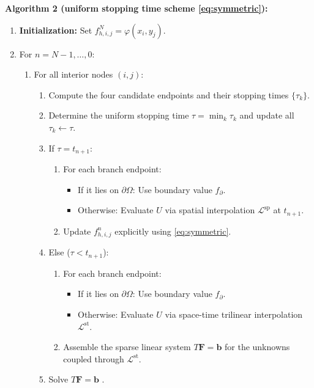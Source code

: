\documentclass[11pt]{article}
\theoremstyle{mythm}
\theoremstyle{definition}
\begin{document}
	\medskip
	\noindent
	\textbf{Algorithm 2 (uniform stopping time scheme \eqref{eq:symmetric}):}
	\begin{enumerate}
		\item \textbf{Initialization:} Set $f_{h,i,j}^N = \varphi(x_i, y_j)$.
		\item For $n = N-1, \dots, 0$:
		\begin{enumerate}
			\item For all interior nodes $(i,j)$:
			\begin{enumerate}
				\item Compute the four candidate endpoints and their stopping times $\{\tau_k\}$.
				\item Determine the uniform stopping time $\tau = \min_k \tau_k$ and update all $\tau_k \leftarrow \tau$.
				\item If $\tau = t_{n+1}$:
				\begin{enumerate}
					\item For each branch endpoint:
					\begin{itemize}
						\item If it lies on $\partial\Omega$: Use boundary value $f_{\partial}$.
						\item Otherwise: Evaluate $U$ via spatial interpolation $\mathcal{L}^{\mathrm{sp}}$ at $t_{n+1}$.
					\end{itemize}
					\item Update $f_{h,i,j}^n$ explicitly using \eqref{eq:symmetric}.
				\end{enumerate}
				\item Else ($\tau < t_{n+1}$):
				\begin{enumerate}
					\item For each branch endpoint:
					\begin{itemize}
						\item If it lies on $\partial\Omega$: Use boundary value $f_{\partial}$.
						\item Otherwise: Evaluate $U$ via space-time trilinear interpolation $\mathcal{L}^{\mathrm{st}}$.
					\end{itemize}
					\item Assemble the sparse linear system $T\mathbf{F} = \mathbf{b}$ for the unknowns coupled through $\mathcal{L}^{\mathrm{st}}$.
				\end{enumerate}
				\item Solve $T\mathbf{F} = \mathbf{b}$ .
			\end{enumerate}
		\end{enumerate}
	\end{enumerate}
	
\end{document}
